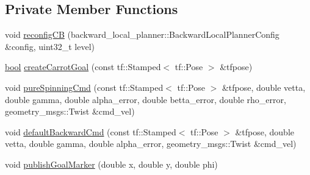 \subsection*{Private Member Functions}
\begin{DoxyCompactItemize}
\item 
void \hyperlink{classbackward__local__planner_1_1BackwardLocalPlanner_a116e148e13ab1b290f241035c72f93b1}{reconfig\+CB} (backward\+\_\+local\+\_\+planner\+::\+Backward\+Local\+Planner\+Config \&config, uint32\+\_\+t level)
\item 
\hyperlink{classbool}{bool} \hyperlink{classbackward__local__planner_1_1BackwardLocalPlanner_a8ee2775f7891177091efb91c85b3ce0c}{create\+Carrot\+Goal} (const tf\+::\+Stamped$<$ tf\+::\+Pose $>$ \&tfpose)
\item 
void \hyperlink{classbackward__local__planner_1_1BackwardLocalPlanner_af8ae130a16e3f7f5d4044d92982ee073}{pure\+Spinning\+Cmd} (const tf\+::\+Stamped$<$ tf\+::\+Pose $>$ \&tfpose, double vetta, double gamma, double alpha\+\_\+error, double betta\+\_\+error, double rho\+\_\+error, geometry\+\_\+msgs\+::\+Twist \&cmd\+\_\+vel)
\item 
void \hyperlink{classbackward__local__planner_1_1BackwardLocalPlanner_aeeb7c645f6965c3c400a948d74cdc7b1}{default\+Backward\+Cmd} (const tf\+::\+Stamped$<$ tf\+::\+Pose $>$ \&tfpose, double vetta, double gamma, double alpha\+\_\+error, geometry\+\_\+msgs\+::\+Twist \&cmd\+\_\+vel)
\item 
void \hyperlink{classbackward__local__planner_1_1BackwardLocalPlanner_a11bb84f641df95b947e6e7100c0177e3}{publish\+Goal\+Marker} (double x, double y, double phi)
\end{DoxyCompactItemize}
